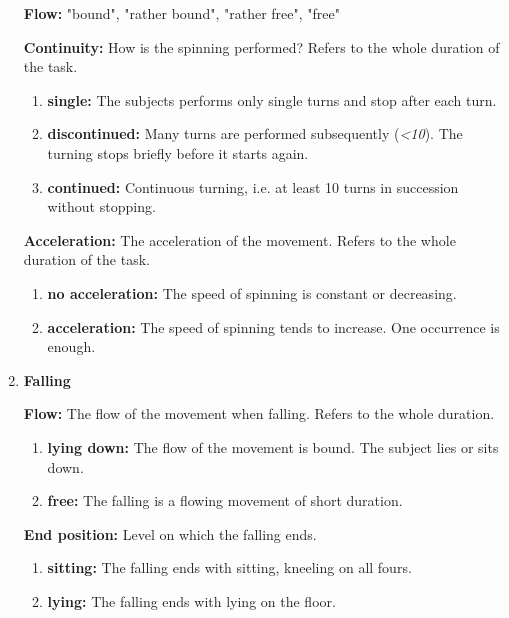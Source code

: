 \documentclass[extern,palatino]{cgMA}
\begin{document}
\begin{enumerate}[I]
    \textbf{Flow:} "bound", "rather bound", "rather free", "free"
    
    \textbf{Continuity:} How is the spinning performed? Refers to the whole duration of the task.
    \begin{enumerate}
        \item \textbf{single:} The subjects performs only single turns and stop after each turn.
        \item \textbf{discontinued:} Many turns are performed subsequently (\textit{<10}). The turning stops briefly before it starts again.
        \item \textbf{continued:} Continuous turning, i.e. at least 10 turns in succession without stopping.
    \end{enumerate}
    
    \textbf{Acceleration:} The acceleration of the movement. Refers to the whole duration of the task.
    \begin{enumerate}
        \item \textbf{no acceleration:} The speed of spinning is constant or decreasing.
        \item \textbf{acceleration:} The speed of spinning tends to increase. One occurrence is enough.
    \end{enumerate}
\item \textbf{Falling}
     
    \textbf{Flow:} The flow of the movement when falling. Refers to the whole duration.
    \begin{enumerate}
        \item \textbf{lying down:} The flow of the movement is bound. The subject lies or sits down.
        \item \textbf{free:} The falling is a flowing movement of short duration.
    \end{enumerate}
    
    \textbf{End position:} Level on which the falling ends.
    \begin{enumerate}
        \item \textbf{sitting:} The falling ends with sitting, kneeling on all fours.
        \item \textbf{lying:} The falling ends with lying on the floor.
    \end{enumerate}
\end{enumerate}
\end{document}
